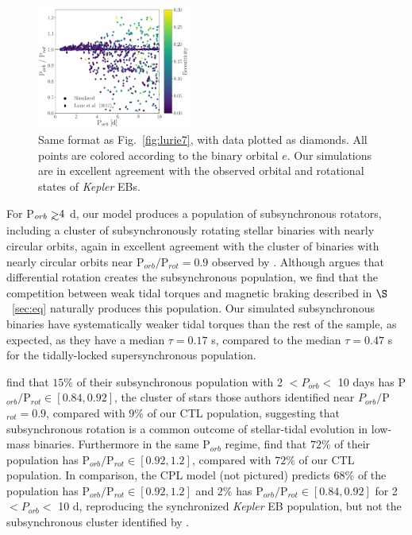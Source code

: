\documentclass[twocolumn]{aastex61}
\def\gsim{~\rlap{$>$}{\lower 1.0ex\hbox{$\sim$}}}
\newcommand{\kepler}[0]{\textit{Kepler}\xspace}
\begin{document}
\begin{figure}
	\includegraphics[width=0.45\textwidth]{../Plots/subsync.pdf}
   \caption{Same format as Fig.~\ref{fig:lurie7}, with \citet{Lurie2017} data plotted as diamonds.  All points are colored according to the binary orbital $e$. Our simulations are in excellent agreement with the observed orbital and rotational states of \kepler EBs. }%
    \label{fig:subsync}%
\end{figure}

For P$_{orb} \gsim 4$ d, our model produces a population of subsynchronous rotators, including a cluster of subsynchronously rotating stellar binaries with nearly circular orbits, again in excellent agreement with the cluster of binaries with nearly circular orbits near P$_{orb}/$P$_{rot} = 0.9$ observed by \citet{Lurie2017}. Although \citet{Lurie2017} argues that differential rotation creates the subsynchronous population, we find that the competition between weak tidal torques and magnetic braking described in $\S$~\ref{sec:eq} naturally produces this population.  Our simulated subsynchronous binaries have systematically weaker tidal torques than the rest of the sample, as expected, as they have a median $\tau = 0.17$ s, compared to the median $\tau = 0.47$ s for the tidally-locked supersynchronous population.  

\citet{Lurie2017} find that $15\%$ of their subsynchronous population with 2 $< P_{orb} <$ 10 days has P$_{orb}/$P$_{rot} \in [0.84, 0.92]$, the cluster of stars those authors identified near $P_{orb}/$P$_{rot} = 0.9$, compared with $9\%$ of our CTL population, suggesting that subsynchronous rotation is a common outcome of stellar-tidal evolution in low-mass binaries. Furthermore in the same P$_{orb}$ regime, \citet{Lurie2017} find that $72\%$ of their population has P$_{orb}/$P$_{rot} \in [0.92, 1.2]$, compared with $72\%$ of our CTL population. In comparison, the CPL model (not pictured) predicts $68\%$ of the population has P$_{orb}/$P$_{rot} \in [0.92, 1.2]$ and $2\%$ has P$_{orb}/$P$_{rot} \in [0.84, 0.92]$ for 2 $< P_{orb} < $ 10 d, reproducing the synchronized \kepler EB population, but not the subsynchronous cluster identified by \citet{Lurie2017}.
\end{document}
